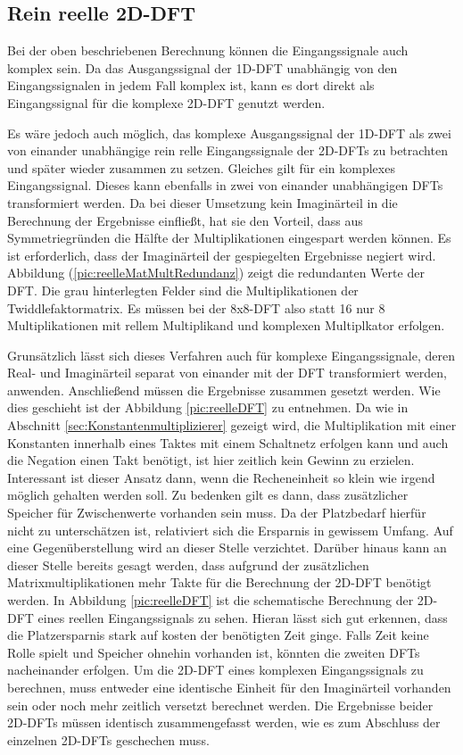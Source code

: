 \subsection{Rein reelle 2D-DFT}\label{sec:rein_reelle_dft}
Bei der oben beschriebenen Berechnung können die Eingangssignale auch komplex sein. Da das Ausgangssignal der 1D-DFT unabhängig von den Eingangssignalen in jedem Fall 
komplex ist, kann es dort direkt als Eingangssignal für die komplexe 2D-DFT genutzt werden. 

Es wäre jedoch auch möglich, das komplexe Ausgangssignal der 1D-DFT als zwei von einander unabhängige rein relle Eingangssignale der 2D-DFTs zu betrachten und später 
wieder zusammen zu setzen. Gleiches gilt für ein komplexes Eingangssignal. Dieses kann ebenfalls in zwei von einander unabhängigen DFTs transformiert werden.
Da bei dieser Umsetzung kein Imaginärteil in die Berechnung der Ergebnisse einfließt, hat sie den Vorteil, dass aus Symmetriegründen die Hälfte der Multiplikationen 
eingespart werden können. Es ist erforderlich, dass der Imaginärteil der gespiegelten Ergebnisse negiert wird. Abbildung (\ref{pic:reelleMatMultRedundanz}) zeigt die 
redundanten Werte der DFT. Die grau hinterlegten Felder sind die Multiplikationen der Twiddlefaktormatrix. Es müssen bei der 8x8-DFT also statt 16 nur 8 Multiplikationen
mit rellem Multiplikand und komplexen Multiplkator erfolgen.

Grunsätzlich lässt sich dieses Verfahren auch für komplexe Eingangssignale, deren Real- und Imaginärteil separat von einander mit der DFT transformiert werden, anwenden.
Anschließend müssen die Ergebnisse zusammen gesetzt werden. Wie dies geschieht ist der Abbildung \ref{pic:reelleDFT} zu entnehmen.
Da wie in Abschnitt \ref{sec:Konstantenmultiplizierer} gezeigt wird, die Multiplikation
mit einer Konstanten innerhalb eines Taktes mit einem Schaltnetz erfolgen kann und auch die Negation einen Takt benötigt, ist hier zeitlich kein Gewinn zu erzielen.
Interessant ist dieser Ansatz dann, wenn die Recheneinheit so klein wie irgend möglich gehalten werden soll. Zu bedenken gilt es dann, dass zusätzlicher Speicher für 
Zwischenwerte vorhanden sein muss. Da der Platzbedarf hierfür nicht zu unterschätzen ist, relativiert sich die Ersparnis in gewissem Umfang. Auf eine Gegenüberstellung
wird an dieser Stelle verzichtet.
Darüber hinaus kann an dieser Stelle bereits gesagt werden, dass aufgrund der zusätzlichen Matrixmultiplikationen mehr Takte für die Berechnung der 2D-DFT benötigt werden.
In Abbildung \ref{pic:reelleDFT} ist die schematische Berechnung der 2D-DFT eines reellen Eingangssignals zu sehen. Hieran lässt sich gut erkennen, dass die Platzersparnis
stark auf kosten der benötigten Zeit ginge. Falls Zeit keine Rolle spielt und Speicher ohnehin vorhanden ist, könnten die zweiten DFTs nacheinander erfolgen.
Um die 2D-DFT eines komplexen Eingangssignals zu berechnen, muss entweder eine identische Einheit für den Imaginärteil vorhanden sein oder noch mehr zeitlich versetzt 
berechnet werden. Die Ergebnisse beider 2D-DFTs müssen identisch zusammengefasst werden, wie es zum Abschluss der einzelnen 2D-DFTs geschechen muss.

